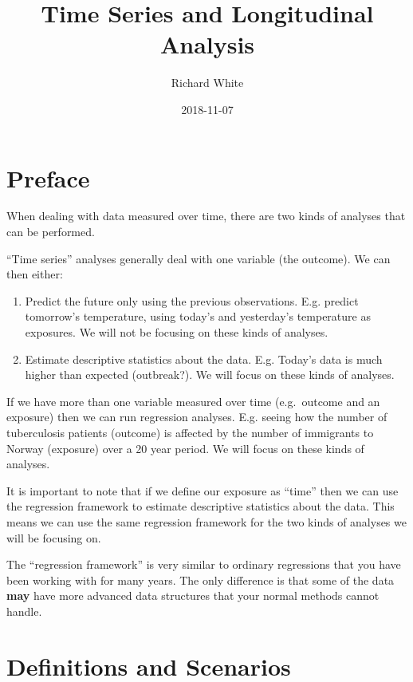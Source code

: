 \documentclass[]{book}
\title{Time Series and Longitudinal Analysis}
\author{Richard White}
\date{2018-11-07}
\providecommand{\tightlist}{%
  \setlength{\itemsep}{0pt}\setlength{\parskip}{0pt}}
\begin{document}
\maketitle

{
\setcounter{tocdepth}{1}
\tableofcontents
}
\chapter*{Preface}\label{preface}

When dealing with data measured over time, there are two kinds of
analyses that can be performed.

``Time series'' analyses generally deal with one variable (the outcome).
We can then either:

\begin{enumerate}
\def\labelenumi{\arabic{enumi}.}
\tightlist
\item
  Predict the future only using the previous observations. E.g. predict
  tomorrow's temperature, using today's and yesterday's temperature as
  exposures. We will not be focusing on these kinds of analyses.
\item
  Estimate descriptive statistics about the data. E.g. Today's data is
  much higher than expected (outbreak?). We will focus on these kinds of
  analyses.
\end{enumerate}

If we have more than one variable measured over time (e.g.~outcome and
an exposure) then we can run regression analyses. E.g. seeing how the
number of tuberculosis patients (outcome) is affected by the number of
immigrants to Norway (exposure) over a 20 year period. We will focus on
these kinds of analyses.

It is important to note that if we define our exposure as ``time'' then
we can use the regression framework to estimate descriptive statistics
about the data. This means we can use the same regression framework for
the two kinds of analyses we will be focusing on.

The ``regression framework'' is very similar to ordinary regressions
that you have been working with for many years. The only difference is
that some of the data \textbf{may} have more advanced data structures
that your normal methods cannot handle.

\chapter{Definitions and Scenarios}\label{definitions-and-scenarios}
\end{document}
